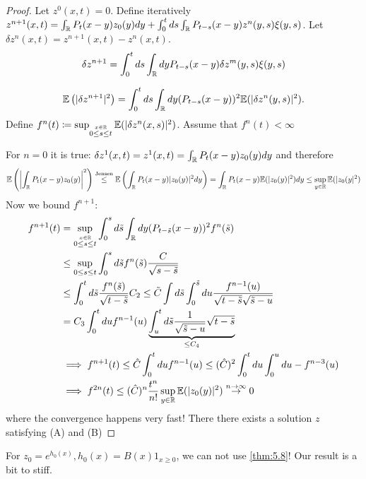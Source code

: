 \begin{proof}
    Let $z^0(x,t)=0$. Define iteratively $z^{n+1}(x,t)=\int_{\mathbb{R}} P_t(x-y)z_0(y)dy+\int_0^t ds \int_{\mathbb{R}} P_{t-s}(x-y)z^n(y,s)\xi(y,s)$.
    Let $\delta z^{n}(x,t)=z^{n+1}(x,t)-z^n(x,t)$.
    \begin{align*}
        \delta z^{n+1}=\int_0^t ds\int_{\mathbb{R}} dy P_{t-s}(x-y)\delta z^m(y,s)\xi(y,s)
    \end{align*}

    \begin{align*}
        \mathbb{E}\left(|\delta z^{n+1}|^2\right) = \int_0^tds\int_{\mathbb{R}} dy (P_{t-s}(x-y))^2\mathbb{E}(\vert \delta z^n(y,s)\vert^2).
    \end{align*}
    Define $f^n(t)\coloneqq \sup_{\stackrel{x\in\mathbb{R}}{0\leq s\leq t}}\mathbb{E}(\vert \delta z^n(x,s)\vert^2)$. Assume that $f^n(t)<\infty$ 
    
    For $n=0$ it is true: $\delta z^1(x,t)=z^1(x,t)=\int_{\mathbb{R}} P_t(x-y)z_0(y)dy$ and therefore 
    \[\mathbb{E}\left(\left\vert \int_{\mathbb{R}} P_t(x-y)z_0(y)\right\vert^2\right)\stackrel{\text{Jensen}}{\leq}\mathbb{E}\left(\int_{\mathbb{R}} P_t(x-y)|z_0(y)|^2dy\right)=\int_{\mathbb{R}} P_t(x-y)\mathbb{E}(|z_0(y)|^2)dy\leq \sup_{y\in\mathbb{R}}\mathbb{E}(|z_0(y|^2)\]
    Now we bound $f^{n+1}$:
    \begin{align*}
        f^{n+1}(t)&=\sup_{\stackrel{x\in\mathbb{R}}{0\leq s \leq t}}\int_0^sd\tilde{s} \int_{\mathbb{R}} dy (P_{t-\tilde{s}}(x-y))^2 f^n(\tilde{s})\\
        &\leq \sup_{0\leq s\leq t}\int_0^s d\tilde{s} f^n(\tilde{s})\frac{C}{\sqrt{s-\tilde{s}}}\\
        &\leq \int_0^t d\tilde{s}\frac{f^n(\tilde{s})}{\sqrt{t-\tilde{s}}}C_2\leq \tilde{C}\int d\tilde{s}\int_0^{\tilde{s}}du \frac{f^{n-1}(u)}{\sqrt{t-\tilde{s}}\sqrt{\tilde{s}-u}}\\
        &=C_3 \int_0^t du f^{n-1}(u)\underbrace{\int_u^t d\tilde{s}\frac{1}{\sqrt{\tilde{s}-u}}\sqrt{t-\tilde{s}}}_{\leq C_4}\\
        &\implies f^{n+1}(t)\leq \hat{C}\int_0^t du f^{n-1}(u)\leq (\hat{C})^2\int_0^t du \int_0^ud u -f^{n-3}(u)\\
        &\implies f^{2n}(t)\leq (\hat{C})^n \frac{t^n}{n!}\sup_{y\in\mathbb{R}} \mathbb{E}(|z_0(y)|^2) \stackrel{n\to\infty}{\to} 0
    \end{align*}
    where the convergence happens very fast! There there exists a solution $z$ satisfying (A) and (B)
\end{proof}

For $z_0=e^{h_0(x)},h_0(x)=B(x)1_{x\geq 0}$, we can not use \ref{thm:5.8}! Our result is a bit to stiff.


